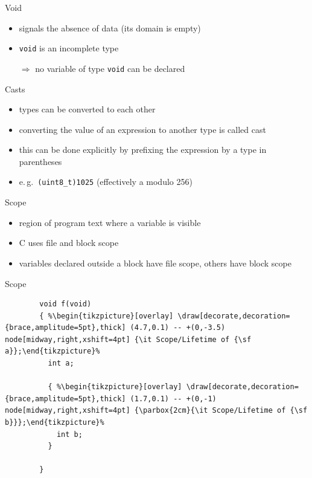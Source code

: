 \documentclass[english,compress]{beamer}
\begin{document}
\begin{frame}{Void}
	\begin{itemize}
		\item signals the absence of data (its domain is empty)
		\item \lstinline|void| is an incomplete type
		\item[$\Rightarrow$] no variable of type \lstinline|void|
			can be declared
	\end{itemize}
\end{frame}

\begin{frame}{Casts}
	\begin{itemize}
		\item types can be converted to each other
		\item converting the value of an expression to another type is called cast
		\item this can be done explicitly by prefixing the expression by a type in parentheses
		\item e.\,g.\ \lstinline|(uint8_t)1025| (effectively a modulo 256)
	\end{itemize}
\end{frame}

\begin{frame}{Scope}
	\begin{itemize}
		\item region of program text where a variable is visible
		\item C uses file and block scope
		\item variables declared outside a block have file scope,
			others have block scope
	\end{itemize}
\end{frame}

\begin{frame}[fragile]{Scope}
	\begin{lstlisting}
		void f(void)
		{ %\begin{tikzpicture}[overlay] \draw[decorate,decoration={brace,amplitude=5pt},thick] (4.7,0.1) -- +(0,-3.5) node[midway,right,xshift=4pt] {\it Scope/Lifetime of {\sf a}};\end{tikzpicture}%
		  int a;

		  { %\begin{tikzpicture}[overlay] \draw[decorate,decoration={brace,amplitude=5pt},thick] (1.7,0.1) -- +(0,-1) node[midway,right,xshift=4pt] {\parbox{2cm}{\it Scope/Lifetime of {\sf b}}};\end{tikzpicture}%
		    int b;
		  }

		}
	\end{lstlisting}
\end{frame}
\end{document}
